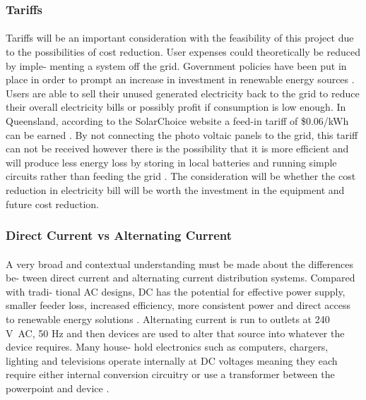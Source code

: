 \subsubsection{Tariffs}

\paragraph{}
Tariffs will be an important consideration with the feasibility of this project due to the
possibilities of cost reduction. User expenses could theoretically be reduced by imple-
menting a system off the grid. Government policies have been put in place in order
to prompt an increase in investment in renewable energy sources \cite{Nelson2011}. Users are able to sell their unused generated electricity back to the grid to reduce their overall electricity
bills or possibly profit if consumption is low enough. In Queensland, according to the
SolarChoice website a feed-in tariff of \$0.06/kWh can be earned \cite{website:SolarChoice}. By not connecting the photo voltaic panels to the grid, this tariff can not be received however there is the possibility that it is more efficient and will produce less energy loss by storing in local
batteries and running simple circuits rather than feeding the grid \cite{AntoniouATzimasARowland2015}. The consideration will be whether the cost reduction in electricity bill will be worth the investment in the equipment and future cost reduction.   

\subsubsection{Direct Current vs Alternating Current}

\paragraph{}
A very broad and contextual understanding must be made about the differences be-
tween direct current and alternating current distribution systems. Compared with tradi-
tional AC designs, DC has the potential for effective power supply, smaller feeder
loss, increased efficiency, more consistent power and direct access to renewable
energy solutions \cite{Liu2014}. Alternating current is run to outlets at 240 \si{V AC}, 50 \si{Hz} and then devices are used to alter that source into whatever the device requires. Many house-
hold electronics such as computers, chargers, lighting and televisions operate internally
at DC voltages meaning they each require either internal conversion circuitry or use a
transformer between the powerpoint and device \cite{Paajanen2009}.

